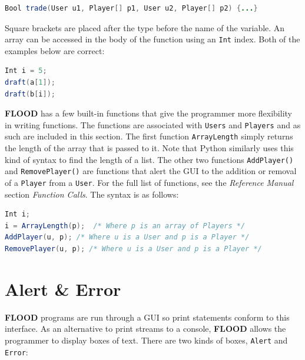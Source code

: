 \documentclass[12pt]{report}
\begin{document}
\begin{singlespace}
\begin{lstlisting}[language=Java,label=some-code,caption={Passing \texttt{User} and \texttt{Player} arrays}]
Bool trade(User u1, Player[] p1, User u2, Player[] p2) {...}
\end{lstlisting}
\end{singlespace}

Square brackets are placed after the type before the name of the variable. An array can be accessed in the body of the function using an \texttt{Int} index. Both of the examples below are correct:

\begin{singlespace}
\begin{lstlisting}[language=Java,label=some-code,caption={Assessing array elements using index.}]
Int i = 5;
draft(a[1]);
draft(b[i]);
\end{lstlisting}
\end{singlespace}

\textbf{FLOOD} has a few built-in functions that give the programmer more flexibility in writing functions. The functions are associated with \texttt{Users} and \texttt{Players} and as such are included in this section. The first function \texttt{ArrayLength} simply returns the length of the array that is passed to it. Note that Python similarly uses this kind of syntax to find the length of a list. The other two functions \texttt{AddPlayer()} and \texttt{RemovePlayer()} are functions that alert the GUI to the addition or removal of a \texttt{Player} from a \texttt{User}. For the full list of functions, see the \textit{Reference Manual} section \textit{Function Calls}. The syntax is as follows:

\begin{singlespace}
\begin{lstlisting}[language=Java,label=some-code,caption={Some FLOOD utility functions and usage.}]
Int i;
i = ArrayLength(p);  /* Where p is an array of Players */
AddPlayer(u, p); /* Where u is a User and p is a Player */
RemovePlayer(u, p); /* Where u is a User and p is a Player */
\end{lstlisting}
\end{singlespace}

\section{Alert \& Error}

\textbf{FLOOD} programs are run through a GUI so print statements conform to this interface. As an alternative to print streams to a console, \textbf{FLOOD} allows the programmer to display boxes of text. There are two kinds of boxes, \texttt{Alert} and \texttt{Error}:
\end{document}
